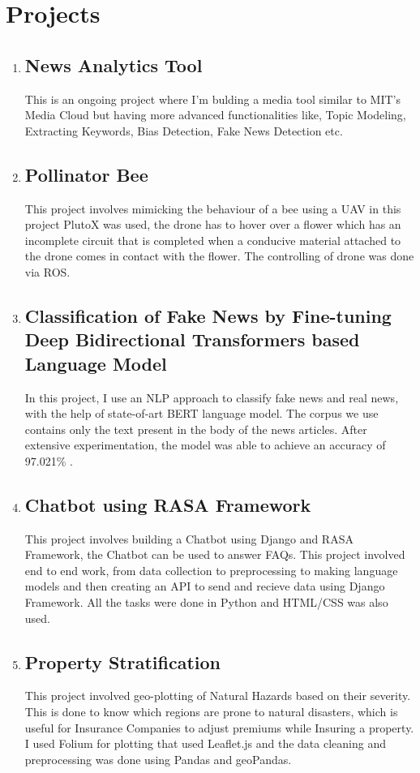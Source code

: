 \documentclass{article}
\begin{document}
\section{Projects}
{\begin{enumerate}


\item \subsection{News Analytics Tool}
 This is an ongoing project where I'm bulding a media tool similar to MIT's Media Cloud but having more advanced functionalities like, Topic Modeling, Extracting Keywords, Bias Detection, Fake News Detection etc. 
\item \subsection{Pollinator Bee}
 This project involves mimicking the behaviour of a bee using a UAV in this project PlutoX was used, the drone has to hover over a flower which has an incomplete circuit that is completed when a conducive material attached to the drone comes in contact with the flower. The controlling of drone was done via ROS.
\item \subsection{Classification of Fake News by Fine-tuning Deep Bidirectional Transformers based Language Model}
  In this project, I use an NLP approach to classify fake news and real news, with the help of state-of-art BERT language model. The corpus we use contains only
the text present in the body of the news articles. After extensive experimentation, the model was
able to achieve an accuracy of 97.021\% .
\item \subsection{Chatbot using RASA Framework}
This project involves building a Chatbot using Django and RASA Framework, the Chatbot can be used to answer FAQs. This project involved end to end work, from data collection to preprocessing to making language models and then creating an API to send and recieve data using Django Framework. All the tasks were done in Python and HTML/CSS was also used.
\item \subsection{Property Stratification}
This project involved geo-plotting of Natural Hazards based on their severity. This is done to know which regions are prone to natural disasters, which is useful for Insurance Companies to adjust premiums while Insuring a property. I used Folium for plotting that used Leaflet.js and the data cleaning and preprocessing was done using Pandas and geoPandas. 


	
\end{enumerate}}
\end{document}
